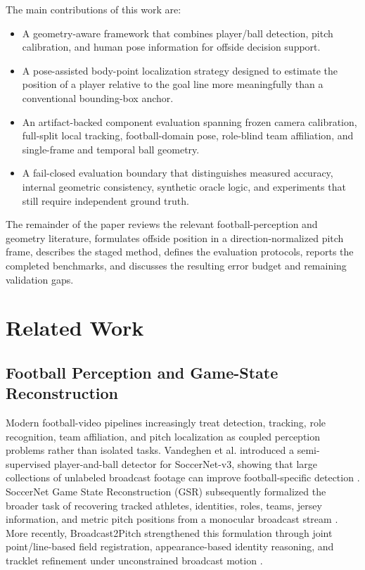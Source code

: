 \documentclass[runningheads]{llncs}
\begin{document}
The main contributions of this work are:
\begin{itemize}
    \item A geometry-aware framework that combines player/ball detection,
    pitch calibration, and human pose information for offside decision support.

    \item A pose-assisted body-point localization strategy designed to estimate
    the position of a player relative to the goal line more meaningfully than a
    conventional bounding-box anchor.

    \item An artifact-backed component evaluation spanning frozen camera calibration,
    full-split local tracking, football-domain pose, role-blind team affiliation,
    and single-frame and temporal ball geometry.

    \item A fail-closed evaluation boundary that distinguishes measured accuracy,
    internal geometric consistency, synthetic oracle logic, and experiments that
    still require independent ground truth.
\end{itemize}

The remainder of the paper reviews the relevant football-perception and geometry literature, formulates offside position in a direction-normalized pitch frame, describes the staged method, defines the evaluation protocols, reports the completed benchmarks, and discusses the resulting error budget and remaining validation gaps.


\section{Related Work}
\label{sec:related_work}

\subsection{Football Perception and Game-State Reconstruction}
Modern football-video pipelines increasingly treat detection, tracking, role recognition, team affiliation, and pitch localization as coupled perception problems rather than isolated tasks. Vandeghen et al. introduced a semi-supervised player-and-ball detector for SoccerNet-v3, showing that large collections of unlabeled broadcast footage can improve football-specific detection \cite{sst}. SoccerNet Game State Reconstruction (GSR) subsequently formalized the broader task of recovering tracked athletes, identities, roles, teams, jersey information, and metric pitch positions from a monocular broadcast stream \cite{gsr}. More recently, Broadcast2Pitch strengthened this formulation through joint point/line-based field registration, appearance-based identity reasoning, and tracklet refinement under unconstrained broadcast motion \cite{broadcast2pitch}.
\end{document}
